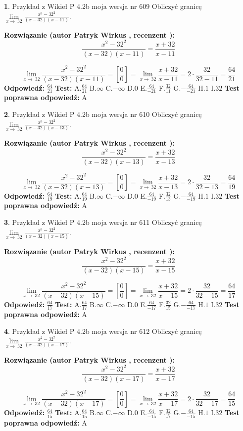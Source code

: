\documentclass[12pt, a4paper]{article}
\theoremstyle{definition} %
\newtheorem{zad}{}
\newcommand{\zadStart}[1]{\begin{zad}#1\newline}
\newcommand{\zadStop}{\end{zad}}
\newcommand{\rozwStart}[2]{\noindent \textbf{Rozwiązanie (autor #1 , recenzent #2): }\newline}
\newcommand{\rozwStop}{\newline}
\newcommand{\odpStart}{\noindent \textbf{Odpowiedź:}\newline}
\newcommand{\odpStop}{\newline}
\newcommand{\testStart}{\noindent \textbf{Test:}\newline}
\newcommand{\testStop}{\newline}
\newcommand{\kluczStart}{\noindent \textbf{Test poprawna odpowiedź:}\newline}
\newcommand{\kluczStop}{\newline}
\begin{document}
\zadStart{Przykład z Wikieł P 4.2b moja wersja nr 609}
Obliczyć granicę $\lim\limits_{x\to\ 32}\frac{x^{2}-32^{2}}{(x-32)(x-11)}$.
\zadStop
\rozwStart{Patryk Wirkus}{}
$$\frac{x^{2}-32^{2}}{(x-32)(x-11)}=\frac{x+32}{x-11}$$

$$\lim\limits_{x\to\ 32}\frac{x^{2}-32^{2}}{(x-32)(x-11)}=[\frac{0}{0}]=\lim\limits_{x\to\ 32}\frac{x+32}{x-11}=2 \cdot \frac{32}{32-11} = \frac{64}{21}$$
\rozwStop
\odpStart
$\frac{64}{21}$
\odpStop
\testStart
A.$\frac{64}{21}$
B.$\infty$
C.$-\infty$
D.$0$
E.$\frac{64}{-21}$
F.$\frac{32}{11}$
G.$-\frac{64}{-21}$
H.$1$
I.$32$
\testStop
\kluczStart
A
\kluczStop



\zadStart{Przykład z Wikieł P 4.2b moja wersja nr 610}
Obliczyć granicę $\lim\limits_{x\to\ 32}\frac{x^{2}-32^{2}}{(x-32)(x-13)}$.
\zadStop
\rozwStart{Patryk Wirkus}{}
$$\frac{x^{2}-32^{2}}{(x-32)(x-13)}=\frac{x+32}{x-13}$$

$$\lim\limits_{x\to\ 32}\frac{x^{2}-32^{2}}{(x-32)(x-13)}=[\frac{0}{0}]=\lim\limits_{x\to\ 32}\frac{x+32}{x-13}=2 \cdot \frac{32}{32-13} = \frac{64}{19}$$
\rozwStop
\odpStart
$\frac{64}{19}$
\odpStop
\testStart
A.$\frac{64}{19}$
B.$\infty$
C.$-\infty$
D.$0$
E.$\frac{64}{-19}$
F.$\frac{32}{13}$
G.$-\frac{64}{-19}$
H.$1$
I.$32$
\testStop
\kluczStart
A
\kluczStop



\zadStart{Przykład z Wikieł P 4.2b moja wersja nr 611}
Obliczyć granicę $\lim\limits_{x\to\ 32}\frac{x^{2}-32^{2}}{(x-32)(x-15)}$.
\zadStop
\rozwStart{Patryk Wirkus}{}
$$\frac{x^{2}-32^{2}}{(x-32)(x-15)}=\frac{x+32}{x-15}$$

$$\lim\limits_{x\to\ 32}\frac{x^{2}-32^{2}}{(x-32)(x-15)}=[\frac{0}{0}]=\lim\limits_{x\to\ 32}\frac{x+32}{x-15}=2 \cdot \frac{32}{32-15} = \frac{64}{17}$$
\rozwStop
\odpStart
$\frac{64}{17}$
\odpStop
\testStart
A.$\frac{64}{17}$
B.$\infty$
C.$-\infty$
D.$0$
E.$\frac{64}{-17}$
F.$\frac{32}{15}$
G.$-\frac{64}{-17}$
H.$1$
I.$32$
\testStop
\kluczStart
A
\kluczStop



\zadStart{Przykład z Wikieł P 4.2b moja wersja nr 612}
Obliczyć granicę $\lim\limits_{x\to\ 32}\frac{x^{2}-32^{2}}{(x-32)(x-17)}$.
\zadStop
\rozwStart{Patryk Wirkus}{}
$$\frac{x^{2}-32^{2}}{(x-32)(x-17)}=\frac{x+32}{x-17}$$

$$\lim\limits_{x\to\ 32}\frac{x^{2}-32^{2}}{(x-32)(x-17)}=[\frac{0}{0}]=\lim\limits_{x\to\ 32}\frac{x+32}{x-17}=2 \cdot \frac{32}{32-17} = \frac{64}{15}$$
\rozwStop
\odpStart
$\frac{64}{15}$
\odpStop
\testStart
A.$\frac{64}{15}$
B.$\infty$
C.$-\infty$
D.$0$
E.$\frac{64}{-15}$
F.$\frac{32}{17}$
G.$-\frac{64}{-15}$
H.$1$
I.$32$
\testStop
\kluczStart
A
\kluczStop
\end{document}
